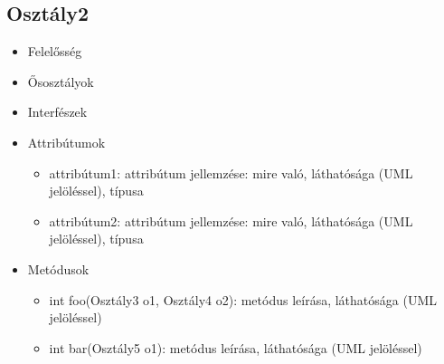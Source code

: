 \subsection{Osztály2}
\begin{itemize}
\item Felelősség\newline
{}
\item Ősosztályok\newline
{}
\item Interfészek\newline
{}
\item Attribútumok\newline
{}
	\begin{itemize}
		\item attribútum1: attribútum jellemzése: mire való, láthatósága (UML jelöléssel), típusa
		\item attribútum2: attribútum jellemzése: mire való, láthatósága (UML jelöléssel), típusa
	\end{itemize}
\item Metódusok\newline
{}
	\begin{itemize}
		\item int foo(Osztály3 o1, Osztály4 o2): metódus leírása, láthatósága (UML jelöléssel)
		\item int bar(Osztály5 o1): metódus leírása, láthatósága (UML jelöléssel)
	\end{itemize}
\end{itemize}



